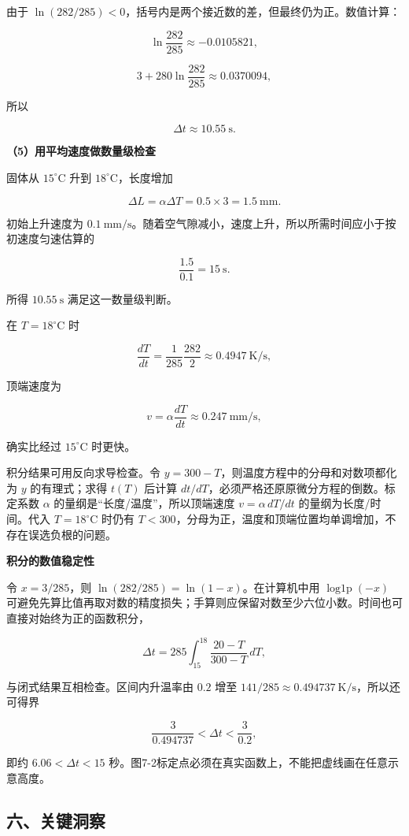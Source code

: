 \documentclass[12pt,a4paper,UTF8]{ctexart}
\begin{document}
由于
\(\ln(282/285)<0\)，括号内是两个接近数的差，但最终仍为正。数值计算：

\[\ln\frac{282}{285}\approx-0.0105821,\]

\[3+280\ln\frac{282}{285}\approx0.0370094,\]

所以

\[\boxed{\Delta t\approx10.55\ \mathrm s}.\]

\textbf{（5）用平均速度做数量级检查}

固体从 \(15^\circ\mathrm C\) 升到 \(18^\circ\mathrm C\)，长度增加

\[\Delta L=\alpha\Delta T
=0.5\times3=1.5\ \mathrm{mm}.\]

初始上升速度为
\(0.1\ \mathrm{mm/s}\)。随着空气隙减小，速度上升，所以所需时间应小于按初速度匀速估算的

\[\frac{1.5}{0.1}=15\ \mathrm s.\]

所得 \(10.55\ \mathrm s\) 满足这一数量级判断。

在 \(T=18^\circ\mathrm C\) 时

\[\frac{dT}{dt}=\frac1{285}\frac{282}{2}
\approx0.4947\ \mathrm{K/s},\]

顶端速度为

\[v=\alpha\frac{dT}{dt}
\approx0.247\ \mathrm{mm/s},\]

确实比经过 \(15^\circ\mathrm C\) 时更快。

积分结果可用反向求导检查。令
\(y=300-T\)，则温度方程中的分母和对数项都化为 \(y\) 的有理式；求得
\(t(T)\) 后计算 \(dt/dT\)，必须严格还原原微分方程的倒数。标定系数
\(\alpha\) 的量纲是``长度/温度''，所以顶端速度 \(v=\alpha\,dT/dt\)
的量纲为长度/时间。代入 \(T=18^\circ\mathrm C\) 时仍有
\(T<300\)，分母为正，温度和顶端位置均单调增加，不存在误选负根的问题。

\textbf{积分的数值稳定性}

令 \(x=3/285\)，则 \(\ln(282/285)=\ln(1-x)\)。在计算机中用
\(\operatorname{log1p}(-x)\)
可避免先算比值再取对数的精度损失；手算则应保留对数至少六位小数。时间也可直接对始终为正的函数积分，

\[\Delta t=285\int_{15}^{18}\frac{20-T}{300-T}\,dT,\]

与闭式结果互相检查。区间内升温率由 \(0.2\) 增至
\(141/285\approx0.494737\ \mathrm{K/s}\)，所以还可得界

\[\frac3{0.494737}<\Delta t<\frac3{0.2},\]

即约 \(6.06<\Delta t<15\)
秒。图7-2标定点必须在真实函数上，不能把虚线画在任意示意高度。

\subsection{六、关键洞察}\label{ux516dux5173ux952eux6d1eux5bdf-6}
\end{document}
